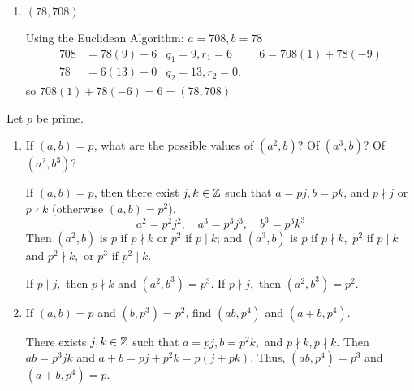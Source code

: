 \documentclass[handout]{ximera}
\begin{document}
\begin{br}
\begin{enumerate}
        \item $(78,708)$
        \begin{solution}
            Using the Euclidean Algorithm:
            $a=708,b=78$
            \begin{align*}
                708 & = 78(9)+6 &q_1=9,r_1=6 &&6=708(1)+78(-9)\\
                78 & = 6(13) +0 & q_2=13, r_2=0.
            \end{align*}
            so $708(1)+78(-6)=6=(78,708)$
        \end{solution}
    \end{enumerate}
    \pdfOnly{\ifhandout{
        \vfill}
        \else
        \fi}
\end{br}



\begin{br}
	Let $p$ be prime.
	\begin{enumerate}
		\item If $(a,b)=p$, what are the possible values of $(a^2,b)$? Of $(a^3,b)$? Of $(a^2,b^3)$?
		
		\begin{solution}
			If $(a,b)=p$, then there exist $j,k\in\mathbb Z$ such that $a=pj, b=pk$, and $p\nmid j$ or $p\nmid k$ (otherwise $(a,b)=p^2$). 
			\[a^2=p^2j^2,\quad
			a^3=p^3j^3,\quad
			b^3=p^3k^3\]
			Then $(a^2,b)$ is $p$ if $p\nmid k$ or $p^2$ if $p\mid k$; and
			$(a^3,b)$ is $p$ if $p\nmid k,$ $p^2$ if $p\mid k$ and $p^2\nmid k,$ or $p^3$ if $p^2\mid k$. 
			
			If $p\mid j,$ then $p\nmid k$ and   
			$(a^2,b^3)=p^3$.
			If $p\nmid j,$ then   
			$(a^2,b^3)=p^2.$
		\end{solution}
		\item If $(a,b)=p$ and $(b,p^3)=p^2$, find $(ab,p^4)$ and $(a+b,p^4)$.
		
		\begin{solution}
			There exists $j,k\in\mathbb Z$ such that $a=pj, b=p^2k,$ and $p\nmid k, p\nmid k$. 
			Then $ab=p^3jk$ and $a+b=pj+p^2k=p(j+pk)$. Thus, $(ab,p^4)=p^3$ and $(a+b,p^4)=p.$
		\end{solution}
	\end{enumerate}
    \pdfOnly{\ifhandout{
        \vfill}
        \else
        \fi}
\end{br}
  
  
\end{document}
